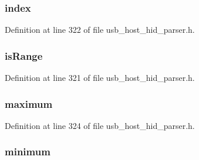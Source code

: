 \subsubsection[{index}]{ index}\label{struct___h_i_d___s_t_r_i_n_g_i_t_e_m_ab7c5089b70ce76bcd61abe615ed2a42b}


Definition at line 322 of file usb\+\_\+host\+\_\+hid\+\_\+parser.\+h.

\hypertarget{struct___h_i_d___s_t_r_i_n_g_i_t_e_m_adeb138fd85166f4e28653db71f8223f2}{}
\subsubsection[{is\+Range}]{ is\+Range}\label{struct___h_i_d___s_t_r_i_n_g_i_t_e_m_adeb138fd85166f4e28653db71f8223f2}


Definition at line 321 of file usb\+\_\+host\+\_\+hid\+\_\+parser.\+h.

\hypertarget{struct___h_i_d___s_t_r_i_n_g_i_t_e_m_ac73161d67a57effa31842c273313b013}{}
\subsubsection[{maximum}]{ maximum}\label{struct___h_i_d___s_t_r_i_n_g_i_t_e_m_ac73161d67a57effa31842c273313b013}


Definition at line 324 of file usb\+\_\+host\+\_\+hid\+\_\+parser.\+h.

\hypertarget{struct___h_i_d___s_t_r_i_n_g_i_t_e_m_ad516b04170f6fc58ccdd8e543309848e}{}
\subsubsection[{minimum}]{ minimum}\label{struct___h_i_d___s_t_r_i_n_g_i_t_e_m_ad516b04170f6fc58ccdd8e543309848e}


